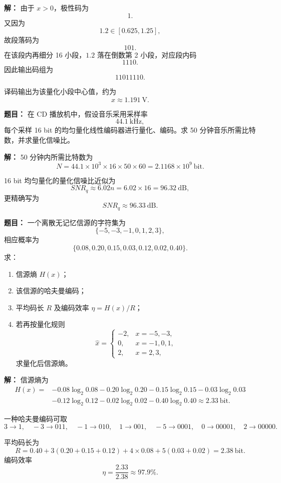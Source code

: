 \par\textbf{解：}
由于 $x>0$，极性码为
\[
1.
\]
又因为
\[
1.2\in[0.625,1.25],
\]
故段落码为
\[
101.
\]
在该段内再细分 16 小段，$1.2$ 落在倒数第 2 小段，对应段内码
\[
1110.
\]
因此输出码组为
\[
11011110.
\]

译码输出为该量化小段中心值，约为
\[
\hat x\approx 1.191\ \text{V}.
\]

\medskip
{}
\textbf{题目：}
在 CD 播放机中，假设音乐采用采样率
\[
44.1\ \text{kHz},
\]
每个采样 16 bit 的均匀量化线性编码器进行量化、编码。求 50 分钟音乐所需比特数，并求量化信噪比。

\par\textbf{解：}
50 分钟内所需比特数为
\[
N=44.1\times 10^3\times 16\times 50\times 60
=2.1168\times 10^9\ \text{bit}.
\]

16 bit 均匀量化的量化信噪比近似为
\[
SNR_q\approx 6.02n=6.02\times 16=96.32\ \text{dB},
\]
更精确写为
\[
SNR_q\approx 96.33\ \text{dB}.
\]

\medskip
{}
\textbf{题目：}
一个离散无记忆信源的字符集为
\[
\{-5,-3,-1,0,1,2,3\},
\]
相应概率为
\[
\{0.08,0.20,0.15,0.03,0.12,0.02,0.40\}.
\]
求：
\begin{enumerate}
\item 信源熵 $H(x)$；
\item 该信源的哈夫曼编码；
\item 平均码长 $R$ 及编码效率 $\eta=H(x)/R$；
\item 若再按量化规则
\[
\hat x=
\begin{cases}
-2,&x=-5,-3,\\
0,&x=-1,0,1,\\
2,&x=2,3,
\end{cases}
\]
求量化后信源熵。
\end{enumerate}

\par\textbf{解：}
信源熵为
\[
\begin{aligned}
H(x)=&-0.08\log_2 0.08-0.20\log_2 0.20-0.15\log_2 0.15-0.03\log_2 0.03\\
&-0.12\log_2 0.12-0.02\log_2 0.02-0.40\log_2 0.40
\approx 2.33\ \text{bit}.
\end{aligned}
\]

一种哈夫曼编码可取
\[
3\to 1,\quad -3\to 011,\quad -1\to 010,\quad 1\to 001,\quad -5\to 0001,\quad 0\to 00001,\quad 2\to 00000.
\]

平均码长为
\[
R=0.40+3(0.20+0.15+0.12)+4\times 0.08+5(0.03+0.02)=2.38\ \text{bit}.
\]
编码效率
\[
\eta=\frac{2.33}{2.38}\approx 97.9\%.
\]

